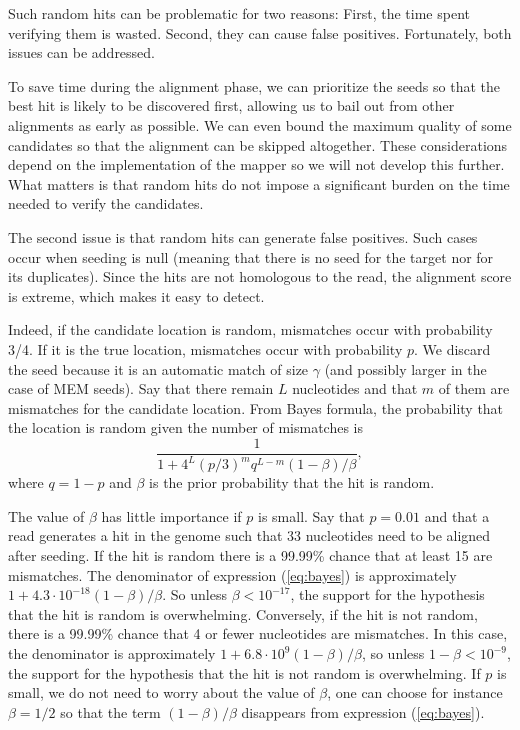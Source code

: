 \documentclass{article}
\begin{document}
Such random hits can be problematic for two reasons: First, the time spent
verifying them is wasted. Second, they can cause false positives.
Fortunately, both issues can be addressed.

To save time during the alignment phase, we can prioritize the seeds so
that the best hit is likely to be discovered first, allowing us to bail
out from other alignments as early as possible. We can even bound the
maximum quality of some candidates so that the alignment can be skipped
altogether. These considerations depend on the implementation of the
mapper so we will not develop this further. What matters is that random
hits do not impose a significant burden on the time needed to verify the
candidates.

The second issue is that random hits can generate false positives. Such
cases occur when seeding is null (meaning that there is no seed for the
target nor for its duplicates). Since the hits are not homologous to the
read, the alignment score is extreme, which makes it easy to detect.

Indeed, if the candidate location is random, mismatches occur with
probability 3/4. If it is the true location, mismatches occur with
probability $p$. We discard the seed because it is an automatic match of
size $\gamma$ (and possibly larger in the case of MEM seeds). Say that
there remain $L$ nucleotides and that $m$ of them are mismatches for the
candidate location. From Bayes formula, the probability that the location
is random given the number of mismatches is
\begin{equation}
\label{eq:bayes}
\frac{1}{1 + 4^L(p/3)^mq^{L-m}(1-\beta)/\beta},
\end{equation}
where $q=1-p$ and $\beta$ is the prior probability that the hit is
random.

The value of $\beta$ has little importance if $p$ is small. Say that
$p=0.01$ and that a read generates a hit in the genome such that 33
nucleotides need to be aligned after seeding. If the hit is random there
is a 99.99\% chance that at least 15 are mismatches. The denominator of
expression (\ref{eq:bayes}) is approximately $1 +
4.3\cdot10^{-18}(1-\beta)/\beta$. So unless $\beta < 10^{-17}$, the
support for the hypothesis that the hit is random is overwhelming.
Conversely, if the hit is not random, there is a 99.99\% chance that 4 or
fewer nucleotides are mismatches. In this case, the denominator is
approximately $1+6.8\cdot10^9(1-\beta)/\beta$, so unless $1-\beta <
10^{-9}$, the support for the hypothesis that the hit is not random is
overwhelming. If $p$ is small, we do not need to worry about the value of
$\beta$, one can choose for instance $\beta=1/2$ so that the term
$(1-\beta)/\beta$ disappears from expression (\ref{eq:bayes}).
\end{document}

